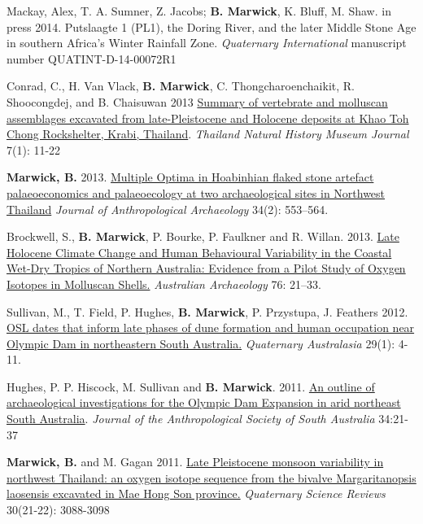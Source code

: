 \documentclass[11pt,article,oneside]{memoir}
\begin{document}
\ind Mackay, Alex, T. A. Sumner, Z. Jacobs; \textbf{B. Marwick}, K. Bluff, M. Shaw. in press 2014. Putslaagte 1 (PL1), the Doring River, and the later Middle Stone Age in southern Africa's Winter Rainfall Zone. \textit{Quaternary International} manuscript number QUATINT-D-14-00072R1

\ind Conrad, C., H. Van Vlack, \textbf{B. Marwick}, C. Thongcharoenchaikit, R. Shoocongdej, and B. Chaisuwan 2013 \href{http://faculty.washington.edu/bmarwick/PDFs/Conrad_et_al_2013_TNHMJ.pdf}{Summary of vertebrate and molluscan assemblages excavated from late-Pleistocene and Holocene deposits at Khao Toh Chong Rockshelter, Krabi, Thailand}. \textit{Thailand Natural History Museum Journal} 7(1): 11-22

\ind \textbf{Marwick, B.} 2013. \href{http://faculty.washington.edu/bmarwick/PDFs/Marwick_2013_JAA.pdf}{Multiple Optima in Hoabinhian flaked stone artefact palaeoeconomics and palaeoecology at two archaeological sites in Northwest Thailand} \textit{Journal of Anthropological Archaeology} 34(2): 553–564.

\ind Brockwell, S., \textbf{B. Marwick}, P. Bourke, P. Faulkner and R. Willan. 2013. \href{http://faculty.washington.edu/bmarwick/PDFs/Brockwell_et_al_2013_AA.pdf}{Late Holocene Climate Change and Human Behavioural Variability in the Coastal Wet-Dry Tropics of Northern Australia: Evidence from a Pilot Study of Oxygen Isotopes in Molluscan Shells.} \textit{Australian Archaeology} 76: 21–33.

\ind Sullivan, M., T. Field, P. Hughes, \textbf{B. Marwick}, P. Przystupa, J. Feathers 2012. \href{http://faculty.washington.edu/bmarwick/PDFs/Sullivan_et_al_2012_OSL_dates_ODX.pdf}{OSL dates that inform late phases of dune formation and human occupation near Olympic Dam in northeastern South Australia.} \textit{Quaternary Australasia} 29(1): 4-11.

\ind Hughes, P. P. Hiscock, M. Sullivan and \textbf{B. Marwick}. 2011. \href{http://faculty.washington.edu/bmarwick/PDFs/Hughes_et_al_2011_JASSA.pdf}{An outline of archaeological investigations for the Olympic Dam Expansion in arid northeast South Australia}. \textit{Journal of the Anthropological Society of South Australia} 34:21-37

\ind \textbf{Marwick, B.} and M. Gagan 2011. \href{http://faculty.washington.edu/bmarwick/PDFs/Marwick_and_Gagan_2011_QSR.pdf}{Late Pleistocene monsoon variability in northwest Thailand: an oxygen isotope sequence from the bivalve Margaritanopsis laosensis excavated in Mae Hong Son province.} \textit{Quaternary Science Reviews} 30(21-22): 3088-3098
\end{document}
